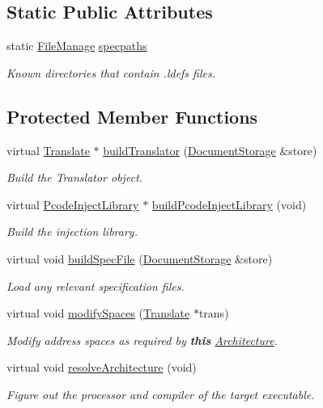 \subsection*{Static Public Attributes}
\begin{DoxyCompactItemize}
\item 
static \mbox{\hyperlink{class_file_manage}{File\+Manage}} \mbox{\hyperlink{class_sleigh_architecture_a198973e576c4ea3039c7deac29402aed}{specpaths}}
\begin{DoxyCompactList}\small\item\em Known directories that contain .ldefs files. \end{DoxyCompactList}\end{DoxyCompactItemize}
\subsection*{Protected Member Functions}
\begin{DoxyCompactItemize}
\item 
virtual \mbox{\hyperlink{class_translate}{Translate}} $\ast$ \mbox{\hyperlink{class_sleigh_architecture_aae195ea2828d13b6e15d16c722d14b18}{build\+Translator}} (\mbox{\hyperlink{class_document_storage}{Document\+Storage}} \&store)
\begin{DoxyCompactList}\small\item\em Build the Translator object. \end{DoxyCompactList}\item 
virtual \mbox{\hyperlink{class_pcode_inject_library}{Pcode\+Inject\+Library}} $\ast$ \mbox{\hyperlink{class_sleigh_architecture_ae0b7773ee748ea290358c389e71f2003}{build\+Pcode\+Inject\+Library}} (void)
\begin{DoxyCompactList}\small\item\em Build the injection library. \end{DoxyCompactList}\item 
virtual void \mbox{\hyperlink{class_sleigh_architecture_a80e8e72ca0059be816575262b7db395f}{build\+Spec\+File}} (\mbox{\hyperlink{class_document_storage}{Document\+Storage}} \&store)
\begin{DoxyCompactList}\small\item\em Load any relevant specification files. \end{DoxyCompactList}\item 
virtual void \mbox{\hyperlink{class_sleigh_architecture_aaf0c0ad5b1160d42fecce0a27ce05674}{modify\+Spaces}} (\mbox{\hyperlink{class_translate}{Translate}} $\ast$trans)
\begin{DoxyCompactList}\small\item\em Modify address spaces as required by {\bfseries{this}} \mbox{\hyperlink{class_architecture}{Architecture}}. \end{DoxyCompactList}\item 
virtual void \mbox{\hyperlink{class_sleigh_architecture_a937a743a8538c2cbfdb40926cd7bc7f8}{resolve\+Architecture}} (void)
\begin{DoxyCompactList}\small\item\em Figure out the processor and compiler of the target executable. \end{DoxyCompactList}\end{DoxyCompactItemize}
